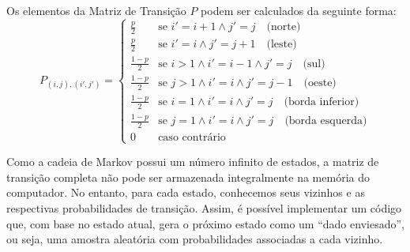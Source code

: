 \begin{enumerate}
\begin{resposta}
\begin{center}
\end{center}
    
    Os elementos da Matriz de Transição $P$ podem ser calculados da seguinte forma:
    $$
    P_{(i,j),(i',j')} = \begin{cases}
    \frac{p}{2} & \text{se } i' = i+1 \land j' = j \quad \text{(norte)} \\
    \frac{p}{2} & \text{se } i' = i \land j' = j+1 \quad \text{(leste)} \\
    \frac{1-p}{2} & \text{se } i > 1 \land i' = i-1 \land j' = j \quad \text{(sul)} \\
    \frac{1-p}{2} & \text{se } j > 1 \land i' = i \land j' = j-1 \quad \text{(oeste)} \\
    \frac{1-p}{2} & \text{se } i = 1 \land i' = i \land j' = j \quad \text{(borda inferior)} \\
    \frac{1-p}{2} & \text{se } j = 1 \land i' = i \land j' = j \quad \text{(borda esquerda)} \\
    0 & \text{caso contrário}
    \end{cases}
    $$

    Como a cadeia de Markov possui um número infinito de estados, a matriz de transição completa não pode ser armazenada integralmente na memória do computador. No entanto, para cada estado, conhecemos seus vizinhos e as respectivas probabilidades de transição. Assim, é possível implementar um código que, com base no estado atual, gera o próximo estado como um ``dado enviesado'', ou seja, uma amostra aleatória com probabilidades associadas a cada vizinho.


\end{resposta}
\end{enumerate}
